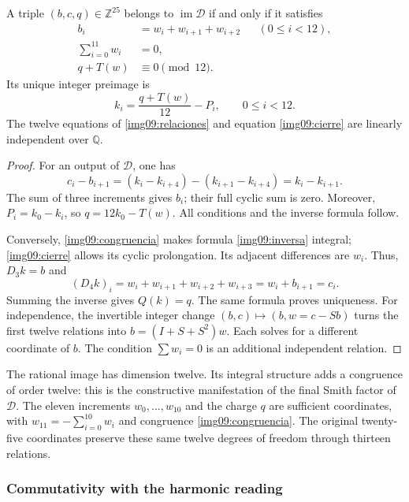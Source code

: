 \begin{theorem}
\label{img09:imagen}
A triple $(b,c,q)\in\mathbb Z^{25}$ belongs to
$\operatorname{im}\mathcal D$ if and only if it satisfies
\begin{align}
 b_i&=w_i+w_{i+1}+w_{i+2}&& (0\leq i<12),
 \label{img09:relaciones}\\
 \sum_{i=0}^{11}w_i&=0,
 \label{img09:cierre}\\
 q+T(w)&\equiv0\pmod {12}.
 \label{img09:congruencia}
\end{align}
Its unique integer preimage is
\begin{equation}
 k_i=\frac{q+T(w)}{12}-P_i,\qquad0\leq i<12.
 \label{img09:inversa}
\end{equation}
The twelve equations of \eqref{img09:relaciones} and equation
\eqref{img09:cierre} are linearly independent over $\mathbb Q$.
\end{theorem}
\begin{proof}
For an output of $\mathcal D$, one has
\[
 c_i-b_{i+1}=(k_i-k_{i+4})-(k_{i+1}-k_{i+4})=k_i-k_{i+1}.
\]
The sum of three increments gives $b_i$; their full cyclic sum
is zero. Moreover, $P_i=k_0-k_i$, so
$q=12k_0-T(w)$. All conditions and the inverse formula follow.

Conversely, \eqref{img09:congruencia} makes formula
\eqref{img09:inversa} integral; \eqref{img09:cierre} allows its cyclic
prolongation. Its adjacent differences are $w_i$. Thus,
$D_3k=b$ and
\[
 (D_4k)_i=w_i+w_{i+1}+w_{i+2}+w_{i+3}
 =w_i+b_{i+1}=c_i.
\]
Summing the inverse gives $Q(k)=q$. The same formula proves uniqueness.
For independence, the invertible integer change
$(b,c)\mapsto(b,w=c-Sb)$ turns the first twelve relations into
$b=(I+S+S^2)w$. Each solves for a different coordinate of $b$.
The condition $\sum w_i=0$ is an additional independent relation.
\end{proof}

The rational image has dimension twelve. Its integral structure adds
a congruence of order twelve: this is the constructive manifestation of
the final Smith factor of $\mathcal D$. The eleven increments
$w_0,\ldots,w_{10}$ and the charge $q$ are sufficient coordinates, with
$w_{11}=-\sum_{i=0}^{10}w_i$ and congruence
\eqref{img09:congruencia}. The original twenty-five coordinates
preserve these same twelve degrees of freedom through thirteen relations.

\subsubsection{Commutativity with the harmonic reading}


